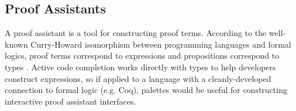\documentclass[10pt, conference, compsocconf]{IEEEtran}
\begin{document}
\subsection{Proof Assistants}
A proof assistant is a tool for constructing proof terms. According to the well-known Curry-Howard isomorphism between programming languages and formal logics, proof terms correspond to expressions and propositions correspond to types \cite{tapl}. Active code completion works directly with types to help developers construct expressions, so if applied to a language with a cleanly-developed connection to formal logic (e.g. Coq), palettes would be useful for constructing  interactive proof assistant interfaces.

%	
\end{document}
